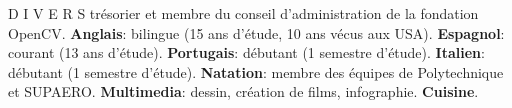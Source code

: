 




\begin{rubric}{D I V E R S}
\entry*[OpenCV]%
  tr\'{e}sorier et membre du conseil d'administration de la fondation OpenCV.
\entry*[Langues]%
  \textbf{Anglais}: bilingue (15 ans d'\'{e}tude, 10 ans v\'{e}cus aux USA).
\entry*[Langues]%
  \textbf{Espagnol}: courant (13 ans d'\'{e}tude).
\entry*[Langues]%
  \textbf{Portugais}: d\'{e}butant (1 semestre d'\'{e}tude).
\entry*[Langues]%
  \textbf{Italien}: d\'{e}butant (1 semestre d'\'{e}tude).
\entry*[Loisirs]
  \textbf{Natation}: membre des \'{e}quipes de Polytechnique et SUPAERO.
\entry*[Loisirs]
  \textbf{Multimedia}: dessin, cr\'{e}ation de films, infographie.
\entry*[Loisirs]
  \textbf{Cuisine}.
\end{rubric}


